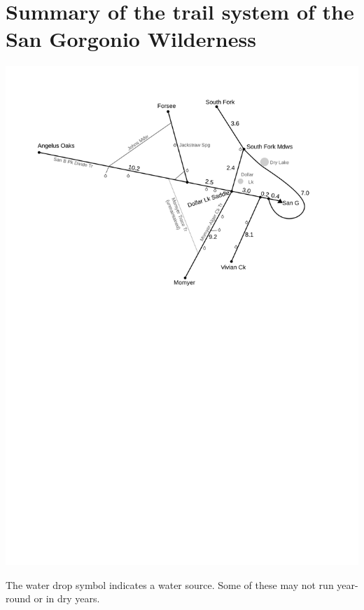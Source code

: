 \documentclass{san-g}
\begin{document}
\section{Summary of the trail system of the San Gorgonio Wilderness}

\vspace{10mm}

\includegraphics{figs/schematic}

The water drop symbol indicates a water source. Some of these may not run year-round or
in dry years.

\vspace{10mm}
\end{document}
